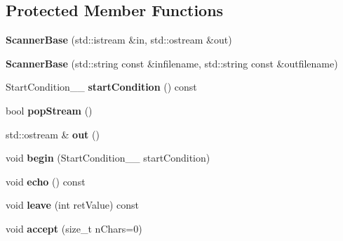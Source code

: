 \subsection*{Protected Member Functions}
\begin{DoxyCompactItemize}
\item 
\hypertarget{classScannerBase_a314e6672cca5961b1cf293017c2778e8}{{\bfseries Scanner\+Base} (std\+::istream \&in, std\+::ostream \&out)}\label{classScannerBase_a314e6672cca5961b1cf293017c2778e8}

\item 
\hypertarget{classScannerBase_adab6f6482546225266827314d4faa4cd}{{\bfseries Scanner\+Base} (std\+::string const \&infilename, std\+::string const \&outfilename)}\label{classScannerBase_adab6f6482546225266827314d4faa4cd}

\item 
\hypertarget{classScannerBase_af594ada5dd8676cfeb8adb5c2aef6ef5}{Start\+Condition\+\_\+\+\_\+ {\bfseries start\+Condition} () const }\label{classScannerBase_af594ada5dd8676cfeb8adb5c2aef6ef5}

\item 
\hypertarget{classScannerBase_a01dfe058b5b337e03aed1012ad9dc002}{bool {\bfseries pop\+Stream} ()}\label{classScannerBase_a01dfe058b5b337e03aed1012ad9dc002}

\item 
\hypertarget{classScannerBase_aa6adde433468e75c4c10b69bca1049d9}{std\+::ostream \& {\bfseries out} ()}\label{classScannerBase_aa6adde433468e75c4c10b69bca1049d9}

\item 
\hypertarget{classScannerBase_a29c66509f23640290421589481d8a388}{void {\bfseries begin} (Start\+Condition\+\_\+\+\_\+ start\+Condition)}\label{classScannerBase_a29c66509f23640290421589481d8a388}

\item 
\hypertarget{classScannerBase_a911243f589c4eaa97578fa6f37916e75}{void {\bfseries echo} () const }\label{classScannerBase_a911243f589c4eaa97578fa6f37916e75}

\item 
\hypertarget{classScannerBase_a186091b02e0982d066a1b187c5bc6894}{void {\bfseries leave} (int ret\+Value) const }\label{classScannerBase_a186091b02e0982d066a1b187c5bc6894}

\item 
\hypertarget{classScannerBase_a18d6405c9ccd130c8176326f728841b2}{void {\bfseries accept} (size\+\_\+t n\+Chars=0)}\label{classScannerBase_a18d6405c9ccd130c8176326f728841b2}


\end{DoxyCompactItemize}
